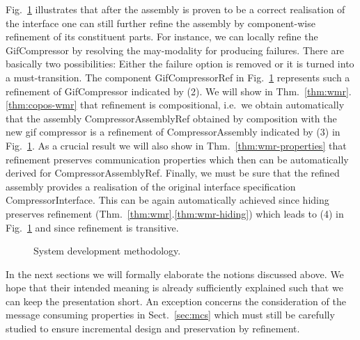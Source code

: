 Fig.~\ref{fig:ex-method} illustrates that after the assembly is proven to be a correct realisation of the interface
one can still further refine the assembly by component-wise refinement of
its constituent parts. For instance, we can locally refine the \textsf{GifCompressor} by resolving
the may-modality for producing failures. There are basically two possibilities: Either the failure option is removed
or it is turned into a must-transition. The component \textsf{GifCompressorRef} in Fig.~\ref{fig:ex-method}
represents such a refinement of \textsf{GifCompressor} indicated by (2).
We will show in Thm.~\ref{thm:wmr}.\ref{thm:copos-wmr} that refinement is compositional,
i.e.\ we obtain automatically that the assembly \textsf{CompressorAssemblyRef} obtained by composition
with the new gif compressor is a refinement of
 \textsf{CompressorAssembly} indicated by (3) in  Fig.~\ref{fig:ex-method}. 
As a crucial result we will also show in Thm.~\ref{thm:wmr-properties}
that refinement preserves communication properties which then can be automatically
derived for \textsf{CompressorAssemblyRef}.
Finally, we must be sure that
the refined assembly provides a realisation of the original interface specification \textsf{CompressorInterface}.
This can be again automatically achieved since hiding preserves refinement
(Thm.~\ref{thm:wmr}.\ref{thm:wmr-hiding})
which leads to (4)  in  Fig.~\ref{fig:ex-method} and since refinement is transitive.

\begin{figure}%
\centering

\caption{System development methodology.}%
\label{fig:ex-method}%
\end{figure}

In the next sections we will formally elaborate the notions discussed above.
We hope that their intended meaning is already sufficiently explained
such that we can keep the presentation short.
An exception concerns the consideration of the message consuming properties in Sect.~\ref{sec:mcs}
which must still be carefully studied to ensure incremental design and preservation by refinement.



